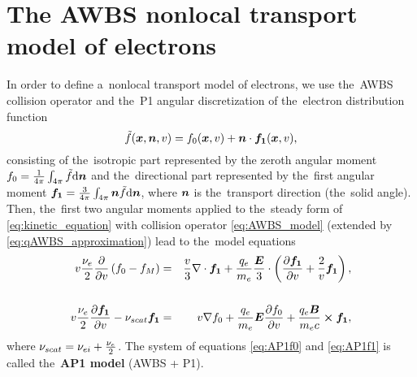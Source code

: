 \section{The AWBS nonlocal transport model of electrons}
\label{sec:AWBSnonlocal}

In order to define a~nonlocal transport model of electrons, 
we use the~AWBS collision operator and the~P1 angular 
discretization of the~electron distribution function
\begin{equation}
  \tilde{f}(\boldsymbol{x}, \boldsymbol{n}, v) = 
  f_0(\boldsymbol{x}, v) + \boldsymbol{n}\cdot{\boldsymbol{f_1}}(\boldsymbol{x}, v) , 
  \label{eq:P1approximation}
\end{equation}
consisting of the~isotropic part represented by the zeroth angular moment 
$f_0 = \frac{1}{4\pi}\int_{4\pi} \tilde{f} \text{d}\boldsymbol{n}$ 
and the~directional part represented by the~first angular moment 
${\boldsymbol{f_1}} = \frac{3}{4\pi}\int_{4\pi} \boldsymbol{n}
\tilde{f} \text{d}\boldsymbol{n}$, where $\boldsymbol{n}$ is the~transport direction (the~solid angle).
Then, the~first two angular moments
\cite{Shkarofsky_Particle_Kinetics_book_1966_24} applied to the~steady form of 
\eqref{eq:kinetic_equation} with collision operator \eqref{eq:AWBS_model} 
(extended by \eqref{eq:qAWBS_approximation}) lead to the~model equations
\begin{eqnarray}
  v\frac{\nu_{e}}{2}\frac{\partial{}}{\partial{v}}\left(f_0 - f_M \right) &=&
  \frac{v}{3}\nabla\cdot{\boldsymbol{f_1}} + \frac{q_e}{m_e}\frac{\boldsymbol{E}}{3}\cdot\left(
  \frac{\partial{{\boldsymbol{f_1}}}}{\partial{v}} + \frac{2}{v}{\boldsymbol{f_1}}\right) , 
  \nonumber \\
  \label{eq:AP1f0}\\
  v\frac{\nu_{e}}{2}\frac{\partial{{\boldsymbol{f_1}}}}{\partial{v}}
  - \nu_{scat}{\boldsymbol{f_1}} &=& 
  v\nabla f_0 + 
  \frac{q_e}{m_e}\boldsymbol{E}\frac{\partial{f_0}}{\partial{v}} 
  +\frac{q_e\boldsymbol{B}}{m_e c}\boldsymbol{\times} {\boldsymbol{f_1}}
  ,
  \nonumber \\
  \label{eq:AP1f1}
\end{eqnarray}
where $\nu_{scat} = \nu_{ei} + \frac{\nu_{e}}{2}$. The system of equations 
\eqref{eq:AP1f0} and \eqref{eq:AP1f1} is called the~{\bf AP1 model} 
(AWBS + P1).  

